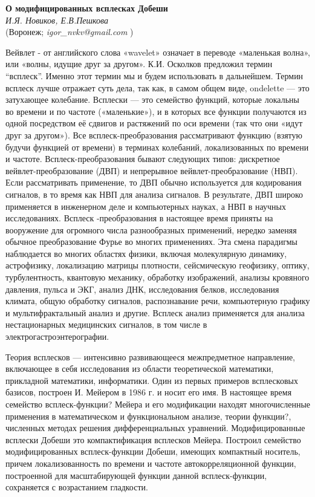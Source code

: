 
\begin{center}{ \bf О модифицированных всплесках Добеши}\\
{\it И.Я. Новиков, Е.В.Пешкова } \\
(Воронеж; {\it igor\_nvkv@gmail.com} )\\

\end{center}


Вейвлет - от английского слова «wavelet» означает в переводе «маленькая волна», или «волны, идущие друг за другом». К.И. Осколков предложил термин “всплеск”. Именно этот термин мы и будем использовать в дальнейшем. Термин всплеск лучше отражает суть дела, так как, в самом общем виде, ondelette — это затухающее колебание.
Всплески — это семейство функций, которые локальны во времени и по частоте («маленькие»), и в которых все функции получаются из одной посредством её сдвигов и растяжений по оси времени (так что они «идут друг за другом»).
Все всплеск-преобразования рассматривают функцию (взятую будучи функцией от времени) в терминах колебаний, локализованных по времени и частоте. Всплеск-преобразования бывают следующих типов: дискретное вейвлет-преобразование (ДВП) и непрерывное вейвлет-преобразование (НВП).
Если рассматривать применение, то ДВП обычно используется для кодирования сигналов, в то время как НВП для анализа сигналов. В результате, ДВП широко применяется в инженерном деле и компьютерных науках, а НВП в научных исследованиях. Всплеск -преобразования в настоящее время приняты на вооружение для огромного числа разнообразных применений, нередко заменяя обычное преобразование Фурье во многих применениях. Эта смена парадигмы наблюдается во многих областях физики, включая молекулярную динамику, астрофизику, локализацию матрицы плотности, сейсмическую геофизику, оптику, турбулентность, квантовую механику, обработку изображений, анализы кровяного давления, пульса и ЭКГ, анализ ДНК, исследования белков, исследования климата, общую обработку сигналов, распознавание речи, компьютерную графику и мультифрактальный анализ и другие. Всплеск анализ применяется для анализа нестационарных медицинских сигналов, в том числе в электрогастроэнтерографии.

Теория всплесков — интенсивно развивающееся межпредметное направление, включающее в себя исследования из области теоретической математики, прикладной математики, информатики. Один из первых примеров всплесковых базисов, построен И. Мейером в 1986 г. и носит его имя. В настоящее время семейство всплеск-функции? Мейера и его модификации находят многочисленные применения в математическом и функциональном анализе, теории функции?, численных методах решения дифференциальных уравнений.
Модифицированные всплески Добеши это компактификация всплесков Мейера.
Построил семейство модифицированных всплеск-функции Добеши, имеющих компактный носитель, причем локализованность по времени и частоте автокорреляционной функции, построенной для масштабирующей функции данной всплеск-функции, сохраняется с возрастанием гладкости. 
